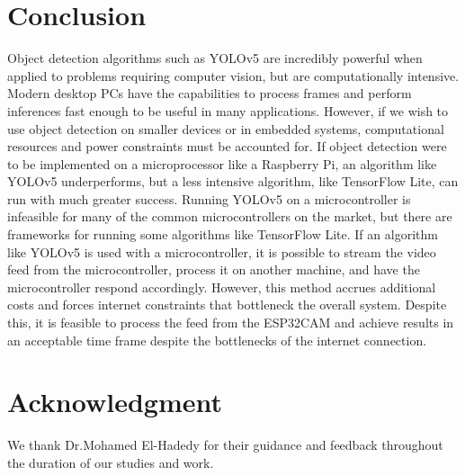 \documentclass[Report]{IEEEtran}
\begin{document}
\section{Conclusion}
Object detection algorithms such as YOLOv5 are incredibly powerful when applied to problems requiring computer vision, but are computationally intensive. Modern desktop PCs have the capabilities to process frames and perform inferences fast enough to be useful in many applications. However, if we wish to use object detection on smaller devices or in embedded systems, computational resources and power constraints must be accounted for. If object detection were to be implemented on a microprocessor like a Raspberry Pi, an algorithm like YOLOv5 underperforms, but a less intensive algorithm, like TensorFlow Lite, can run with much greater success. Running YOLOv5 on a microcontroller is infeasible for many of the common microcontrollers on the market, but there are frameworks for running some algorithms like TensorFlow Lite. If an algorithm like YOLOv5 is used with a microcontroller, it is possible to stream the video feed from the microcontroller, process it on another machine, and have the microcontroller respond accordingly. However, this method accrues additional costs and forces internet constraints that bottleneck the overall system. Despite this, it is feasible to process the feed from the ESP32CAM and achieve results in an acceptable time frame despite the bottlenecks of the internet connection.

\section*{Acknowledgment}
We thank Dr.Mohamed El-Hadedy for their guidance and feedback throughout the duration of our studies and work.
\end{document}
